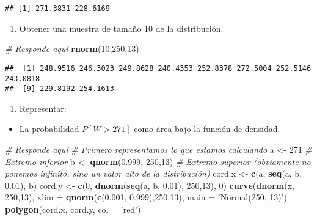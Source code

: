 \documentclass[
]{article}
\newenvironment{Shaded}{\begin{snugshade}}{\end{snugshade}}
\newcommand{\CommentTok}[1]{\textcolor[rgb]{0.56,0.35,0.01}{\textit{#1}}}
\newcommand{\DataTypeTok}[1]{\textcolor[rgb]{0.13,0.29,0.53}{#1}}
\newcommand{\DecValTok}[1]{\textcolor[rgb]{0.00,0.00,0.81}{#1}}
\newcommand{\FloatTok}[1]{\textcolor[rgb]{0.00,0.00,0.81}{#1}}
\newcommand{\KeywordTok}[1]{\textcolor[rgb]{0.13,0.29,0.53}{\textbf{#1}}}
\newcommand{\NormalTok}[1]{#1}
\newcommand{\StringTok}[1]{\textcolor[rgb]{0.31,0.60,0.02}{#1}}
\providecommand{\tightlist}{%
  \setlength{\itemsep}{0pt}\setlength{\parskip}{0pt}}
\begin{document}
\begin{verbatim}
## [1] 271.3831 228.6169
\end{verbatim}

\begin{enumerate}
\def\labelenumi{\arabic{enumi}.}
\setcounter{enumi}{2}
\tightlist
\item
  Obtener una muestra de tamaño 10 de la distribución.
\end{enumerate}

\begin{Shaded}
\begin{Highlighting}[]
\CommentTok{# Responde aquí}
\KeywordTok{rnorm}\NormalTok{(}\DecValTok{10}\NormalTok{,}\DecValTok{250}\NormalTok{,}\DecValTok{13}\NormalTok{)}
\end{Highlighting}
\end{Shaded}

\begin{verbatim}
##  [1] 248.9516 246.3023 249.8628 240.4353 252.8378 272.5004 252.5146 243.0818
##  [9] 229.8192 254.1613
\end{verbatim}

\begin{enumerate}
\def\labelenumi{\arabic{enumi}.}
\setcounter{enumi}{3}
\tightlist
\item
  Representar:
\end{enumerate}

\begin{itemize}
\tightlist
\item
  La probabilidad \(P [W > 271]\) como área bajo la función de densidad.
\end{itemize}

\begin{Shaded}
\begin{Highlighting}[]
\CommentTok{# Responde aquí}
\CommentTok{# Primero representamos lo que estamos calculando}
\NormalTok{a <-}\StringTok{ }\DecValTok{271} \CommentTok{# Extremo inferior}
\NormalTok{b <-}\StringTok{ }\KeywordTok{qnorm}\NormalTok{(}\FloatTok{0.999}\NormalTok{, }\DecValTok{250}\NormalTok{,}\DecValTok{13}\NormalTok{) }\CommentTok{# Extremo superior (obviamente no ponemos infinito, sino un valor alto de la distribución)}
\NormalTok{cord.x <-}\StringTok{ }\KeywordTok{c}\NormalTok{(a, }\KeywordTok{seq}\NormalTok{(a, b, }\FloatTok{0.01}\NormalTok{), b) }
\NormalTok{cord.y <-}\StringTok{ }\KeywordTok{c}\NormalTok{(}\DecValTok{0}\NormalTok{, }\KeywordTok{dnorm}\NormalTok{(}\KeywordTok{seq}\NormalTok{(a, b, }\FloatTok{0.01}\NormalTok{), }\DecValTok{250}\NormalTok{,}\DecValTok{13}\NormalTok{), }\DecValTok{0}\NormalTok{) }
\KeywordTok{curve}\NormalTok{(}\KeywordTok{dnorm}\NormalTok{(x, }\DecValTok{250}\NormalTok{,}\DecValTok{13}\NormalTok{), }\DataTypeTok{xlim =} \KeywordTok{qnorm}\NormalTok{(}\KeywordTok{c}\NormalTok{(}\FloatTok{0.001}\NormalTok{, }\FloatTok{0.999}\NormalTok{),}\DecValTok{250}\NormalTok{,}\DecValTok{13}\NormalTok{), }\DataTypeTok{main =} \StringTok{'Normal(250, 13)'}\NormalTok{) }
\KeywordTok{polygon}\NormalTok{(cord.x, cord.y, }\DataTypeTok{col =} \StringTok{'red'}\NormalTok{)}
\end{Highlighting}
\end{Shaded}
\end{document}
